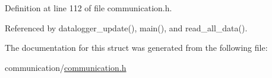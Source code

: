 Definition at line 112 of file communication.\-h.



Referenced by datalogger\-\_\-update(), main(), and read\-\_\-all\-\_\-data().



The documentation for this struct was generated from the following file\-:\begin{DoxyCompactItemize}
\item 
communication/\hyperlink{communication_2communication_8h}{communication.\-h}\end{DoxyCompactItemize}
